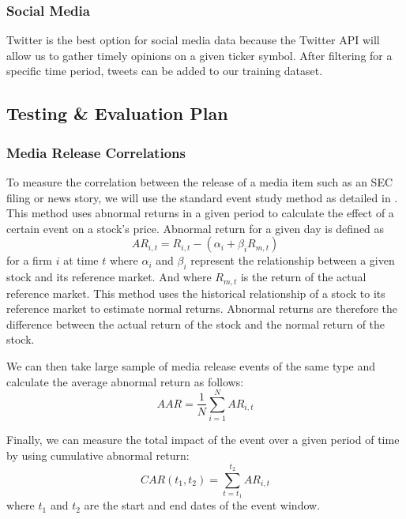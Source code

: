 \documentclass[conference]{IEEEtran}
\begin{document}
\subsubsection{Social Media}
Twitter is the best option for social media data because the Twitter API \cite{twitterapi} will allow us to gather timely opinions on a given ticker symbol. After filtering for a specific time period, tweets can be added to our training dataset.

\subsection{Testing \& Evaluation Plan}

\subsubsection{Media Release Correlations} \label{math}
To measure the correlation between the release of a media item such as an SEC filing or news story, we will use the standard event study method as detailed in \cite{Neuhierl2010}. This method uses abnormal returns in a given period to calculate the effect of a certain event on a stock's price. Abnormal return for a given day is defined as 
\begin{equation}
    AR_{i,t}=R_{i,t}-(\alpha_i+\beta_i R_{m,t})
\end{equation}
for a firm $i$ at time $t$ where $\alpha_i$ and $\beta_i$ represent the relationship between a given stock and its reference market. And where $R_{m,t}$ is the return of the actual reference market. This method uses the historical relationship of a stock to its reference market to estimate normal returns. Abnormal returns are therefore the difference between the actual return of the stock and the normal return of the stock. 

We can then take large sample of media release events of the same type and calculate the average abnormal return as follows:
\begin{equation}
    AAR= \frac{1}{N} \sum\limits_{i=1}^{N}AR_{i,t}
\end{equation}

Finally, we can measure the total impact of the event over a given period of time by using cumulative abnormal return:
\begin{equation}
    CAR(t_1,t_2)=\sum\limits_{t=t_1}^{t_2} AR_{i,t} 
\end{equation}
where $t_1$ and $t_2$ are the start and end dates of the event window.
\end{document}
